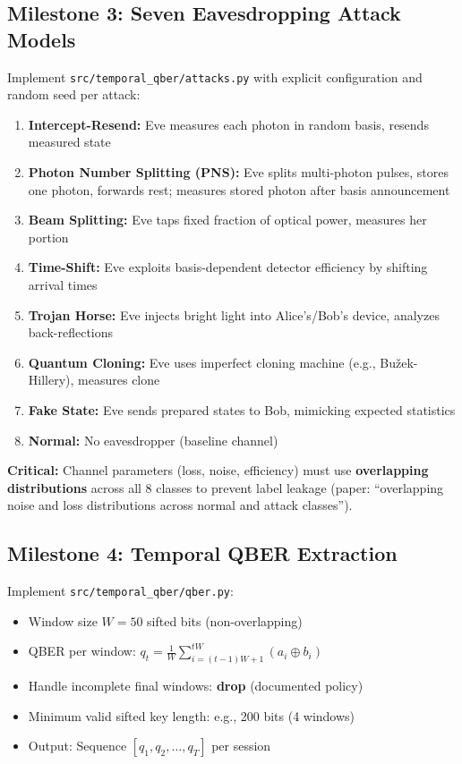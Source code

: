 \subsection{Milestone 3: Seven Eavesdropping Attack Models}
\label{milestone:attacks}
Implement \texttt{src/temporal\_qber/attacks.py} with explicit configuration and random seed per attack:

\begin{enumerate}
    \item \textbf{Intercept-Resend:} Eve measures each photon in random basis, resends measured state
    \item \textbf{Photon Number Splitting (PNS):} Eve splits multi-photon pulses, stores one photon, forwards rest; measures stored photon after basis announcement
    \item \textbf{Beam Splitting:} Eve taps fixed fraction of optical power, measures her portion
    \item \textbf{Time-Shift:} Eve exploits basis-dependent detector efficiency by shifting arrival times
    \item \textbf{Trojan Horse:} Eve injects bright light into Alice's/Bob's device, analyzes back-reflections
    \item \textbf{Quantum Cloning:} Eve uses imperfect cloning machine (e.g., Bu\v{z}ek-Hillery), measures clone
    \item \textbf{Fake State:} Eve sends prepared states to Bob, mimicking expected statistics
    \item \textbf{Normal:} No eavesdropper (baseline channel)
\end{enumerate}

\textbf{Critical:} Channel parameters (loss, noise, efficiency) must use \textbf{overlapping distributions} across all 8 classes to prevent label leakage (paper: ``overlapping noise and loss distributions across normal and attack classes'').

\subsection{Milestone 4: Temporal QBER Extraction}
\label{milestone:qber}
Implement \texttt{src/temporal\_qber/qber.py}:
\begin{itemize}
    \item Window size $W = 50$ sifted bits (non-overlapping)
    \item QBER per window: $q_t = \frac{1}{W}\sum_{i=(t-1)W+1}^{tW} (a_i \oplus b_i)$
    \item Handle incomplete final windows: \textbf{drop} (documented policy)
    \item Minimum valid sifted key length: e.g., 200 bits (4 windows)
    \item Output: Sequence $[q_1, q_2, \ldots, q_T]$ per session
\end{itemize}

